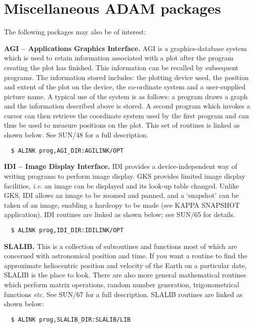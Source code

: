 \documentclass[twoside,11pt]{article}
\renewcommand{\_}{{\tt\char'137}}
\newcommand{\xref}[3]{#1}
\newcommand{\xlabel}[1]{}
\begin{document}
\newpage
\section{Miscellaneous ADAM packages\label{misc}\xlabel{miscellaneous_adam_packages}}

The following packages may also be of interest:
\begin{description}
\item{\bf AGI -- Applications Graphics Interface.} AGI is a graphics-database
system  which is used to retain information associated with a plot after the
program creating the plot has finished. This information can be recalled
by subsequent programs.
The information stored includes: the plotting device used,
the position  and extent of the plot on the device, the
co-ordinate system and a user-supplied picture name.
A typical use of the system is as follows: a program draws a graph
and the information described above is stored.
A second program which invokes a cursor
can then retrieve the coordinate system used by the first
program and can thus be used to measure positions on the plot.
This set of routines is linked as shown below.
See \xref{SUN/48}{sun48}{} for a full description.
\begin{verbatim}
  $ ALINK prog,AGI_DIR:AGILINK/OPT
\end{verbatim}

\item{\bf IDI -- Image Display Interface.}
IDI provides a device-independent way of writing programs to perform
image display.
GKS provides limited image display facilities, {\it i.e.} an image can be
displayed  and  its look-up table changed.
Unlike GKS, IDI allows an image to be zoomed and panned, and a
`snapshot' can be taken of an image, enabling a hardcopy to be made
(see KAPPA SNAPSHOT application).
IDI routines are linked as shown below; see \xref{SUN/65}{sun65}{} for details.
\begin{verbatim}
  $ ALINK prog,IDI_DIR:IDILINK/OPT
\end{verbatim}

\item{\bf SLALIB.} This is a collection of subroutines and functions
most of which are concerned with astronomical position and time.
If you want a routine to find the approximate heliocentric position and
velocity of the Earth on a particular date, SLALIB is the place to look.
There are also more general mathematical routines which perform
matrix operations, random number generation, trigonometrical functions
{\it etc.}
See \xref{SUN/67}{sun67}{} for a full description.
SLALIB routines are linked as shown below:
\begin{verbatim}
  $ ALINK prog,SLALIB_DIR:SLALIB/LIB
\end{verbatim}


\end{description}
\end{document}
